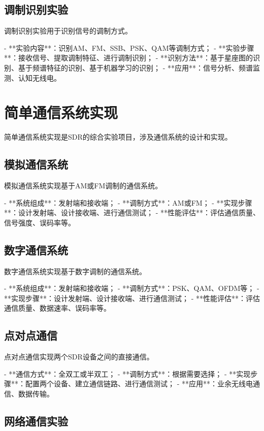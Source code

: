 ﻿\documentclass[UTF8]{ctexbook}
\begin{document}
\subsection{调制识别实验}

调制识别实验用于识别信号的调制方式。

- **实验内容**：识别AM、FM、SSB、PSK、QAM等调制方式；
- **实验步骤**：接收信号、提取调制特征、进行调制识别；
- **识别方法**：基于星座图的识别、基于频谱特征的识别、基于机器学习的识别；
- **应用**：信号分析、频谱监测、认知无线电。

\section{简单通信系统实现}

简单通信系统实现是SDR的综合实验项目，涉及通信系统的设计和实现。

\subsection{模拟通信系统}

模拟通信系统实现基于AM或FM调制的通信系统。

- **系统组成**：发射端和接收端；
- **调制方式**：AM或FM；
- **实现步骤**：设计发射端、设计接收端、进行通信测试；
- **性能评估**：评估通信质量、信号强度、误码率等。

\subsection{数字通信系统}

数字通信系统实现基于数字调制的通信系统。

- **系统组成**：发射端和接收端；
- **调制方式**：PSK、QAM、OFDM等；
- **实现步骤**：设计发射端、设计接收端、进行通信测试；
- **性能评估**：评估通信质量、数据速率、误码率等。

\subsection{点对点通信}

点对点通信实现两个SDR设备之间的直接通信。

- **通信方式**：全双工或半双工；
- **调制方式**：根据需要选择；
- **实现步骤**：配置两个设备、建立通信链路、进行通信测试；
- **应用**：业余无线电通信、数据传输。

\subsection{网络通信实验}
\end{document}
